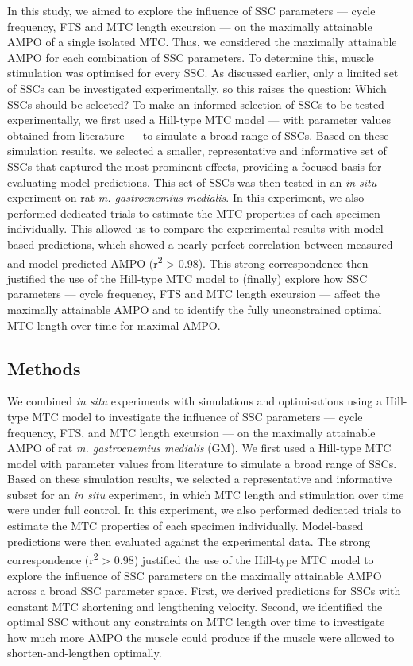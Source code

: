 \documentclass[
  10pt,
  letterpaper,
]{article}
\begin{document}
In this study, we aimed to explore the influence of SSC parameters ---
cycle frequency, FTS and MTC length excursion --- on the maximally
attainable AMPO of a single isolated MTC. Thus, we considered the
maximally attainable AMPO for each combination of SSC parameters. To
determine this, muscle stimulation was optimised for every SSC. As
discussed earlier, only a limited set of SSCs can be investigated
experimentally, so this raises the question: Which SSCs should be
selected? To make an informed selection of SSCs to be tested
experimentally, we first used a Hill-type MTC model --- with parameter
values obtained from literature --- to simulate a broad range of SSCs.
Based on these simulation results, we selected a smaller, representative
and informative set of SSCs that captured the most prominent effects,
providing a focused basis for evaluating model predictions. This set of
SSCs was then tested in an \emph{in situ} experiment on rat \emph{m.
gastrocnemius medialis}. In this experiment, we also performed dedicated
trials to estimate the MTC properties of each specimen individually.
This allowed us to compare the experimental results with model-based
predictions, which showed a nearly perfect correlation between measured
and model-predicted AMPO (r\textsuperscript{2} \textgreater{} 0.98).
This strong correspondence then justified the use of the Hill-type MTC
model to (finally) explore how SSC parameters --- cycle frequency, FTS
and MTC length excursion --- affect the maximally attainable AMPO and to
identify the fully unconstrained optimal MTC length over time for
maximal AMPO.

\subsection{Methods}\label{methods}

We combined \emph{in situ} experiments with simulations and
optimisations using a Hill-type MTC model to investigate the influence
of SSC parameters --- cycle frequency, FTS, and MTC length excursion ---
on the maximally attainable AMPO of rat \emph{m. gastrocnemius medialis}
(GM). We first used a Hill-type MTC model with parameter values from
literature to simulate a broad range of SSCs. Based on these simulation
results, we selected a representative and informative subset for an
\emph{in situ} experiment, in which MTC length and stimulation over time
were under full control. In this experiment, we also performed dedicated
trials to estimate the MTC properties of each specimen individually.
Model-based predictions were then evaluated against the experimental
data. The strong correspondence (r\textsuperscript{2} \textgreater{}
0.98) justified the use of the Hill-type MTC model to explore the
influence of SSC parameters on the maximally attainable AMPO across a
broad SSC parameter space. First, we derived predictions for SSCs with
constant MTC shortening and lengthening velocity. Second, we identified
the optimal SSC without any constraints on MTC length over time to
investigate how much more AMPO the muscle could produce if the muscle
were allowed to shorten-and-lengthen optimally.
\end{document}
